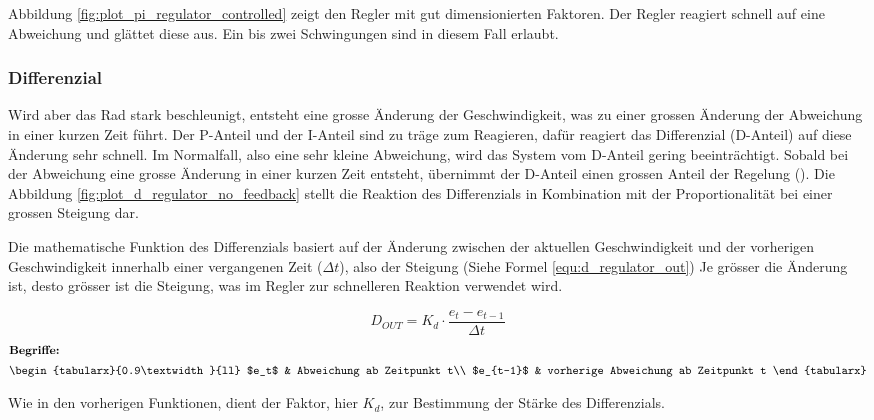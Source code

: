 

Abbildung \ref{fig:plot_pi_regulator_controlled} zeigt den Regler mit gut dimensionierten Faktoren. Der Regler reagiert schnell auf eine Abweichung und glättet diese aus. Ein bis zwei Schwingungen sind in diesem Fall erlaubt.


\newpara

\newpage
\subsubsection{Differenzial}
Wird aber das Rad stark beschleunigt, entsteht eine grosse Änderung der Geschwindigkeit, was zu einer grossen Änderung der Abweichung in einer kurzen Zeit führt. Der P-Anteil und der I-Anteil sind zu träge zum Reagieren, dafür reagiert das Differenzial (D-Anteil) auf diese Änderung sehr schnell. Im Normalfall, also eine sehr kleine Abweichung, wird das System vom D-Anteil gering beeinträchtigt. Sobald bei der Abweichung eine grosse Änderung in einer kurzen Zeit entsteht, übernimmt der D-Anteil einen grossen Anteil der Regelung (\cite{schulmaterial_regler}).
\newpara
Die Abbildung \ref{fig:plot_d_regulator_no_feedback} stellt die Reaktion des Differenzials in Kombination mit der Proportionalität bei einer grossen Steigung dar.



Die mathematische Funktion des Differenzials basiert auf der Änderung zwischen der aktuellen Geschwindigkeit und der vorherigen Geschwindigkeit innerhalb einer vergangenen Zeit ($\Delta t$), also der Steigung (Siehe Formel \ref{equ:d_regulator_out}) Je grösser die Änderung ist, desto grösser ist die Steigung, was im Regler zur schnelleren Reaktion verwendet wird.

\begin{equation}
  \label{equ:d_regulator_out}
  D_{OUT}= K_d\cdot \frac{e_t-e_{t-1}}{\Delta t}
\end{equation}
\begin{gather}
  \shortintertext{\textbf{Begriffe:}}
  \begin{tabularx}{0.9\textwidth}{ll}
    $e_t$ & Abweichung ab Zeitpunkt t\\
    $e_{t-1}$ & vorherige Abweichung ab Zeitpunkt t
  \end{tabularx}\nonumber
\end{gather}

Wie in den vorherigen Funktionen, dient der Faktor, hier $K_d$, zur Bestimmung der Stärke des Differenzials.


